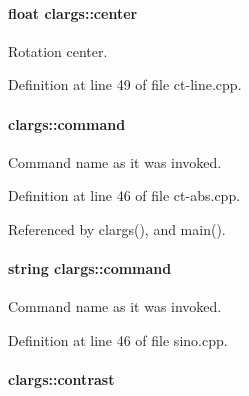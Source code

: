 \hypertarget{structclargs_a754006a265d07d01ba9333ad6f0624d5}{
\paragraph[{center}]{\setlength{\rightskip}{0pt plus 5cm}float {\bf clargs::center}}\hfill}
\label{structclargs_a754006a265d07d01ba9333ad6f0624d5}


Rotation center. 



Definition at line 49 of file ct-\/line.cpp.

\hypertarget{structclargs_a37d3c372e8b8561d515d9f21ad71b5d6}{
\paragraph[{command}]{ {\bf clargs::command}}\hfill}
\label{structclargs_a37d3c372e8b8561d515d9f21ad71b5d6}


Command name as it was invoked. 



Definition at line 46 of file ct-\/abs.cpp.



Referenced by clargs(), and main().

\hypertarget{structclargs_a8aa339bd9296e4de3e77342c84571b21}{
\paragraph[{command}]{\setlength{\rightskip}{0pt plus 5cm}string {\bf clargs::command}}\hfill}
\label{structclargs_a8aa339bd9296e4de3e77342c84571b21}


Command name as it was invoked. 



Definition at line 46 of file sino.cpp.

\hypertarget{structclargs_a0653caf3cc562b9859564416bcc4f786}{
\paragraph[{contrast}]{ {\bf clargs::contrast}}\hfill}
\label{structclargs_a0653caf3cc562b9859564416bcc4f786}



